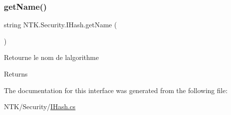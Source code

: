 \subsubsection{\texorpdfstring{getName()}{getName()}}
{\footnotesize\ttfamily string N\+T\+K.\+Security.\+I\+Hash.\+get\+Name (\begin{DoxyParamCaption}{ }\end{DoxyParamCaption})}



Retourne le nom de l\textquotesingle{}algorithme 

\begin{DoxyReturn}{Returns}

\end{DoxyReturn}


The documentation for this interface was generated from the following file\+:\begin{DoxyCompactItemize}
\item 
N\+T\+K/\+Security/\mbox{\hyperlink{_i_hash_8cs}{I\+Hash.\+cs}}\end{DoxyCompactItemize}
